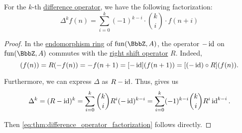 \begin{proposition}\label{thm:difference_operator_factorization}
  For the \( k \)-th \hyperref[def:difference_operator]{difference operator}, we have the following factorization:
  \begin{equation}\label{eq:thm:difference_operator_factorization}
    \Delta^k f(n) = \sum_{i=0}^k (-1)^{k-i} \cdot \binom k i \cdot f(n + i)
  \end{equation}
\end{proposition}
\begin{proof}
  In the \hyperref[def:endomorphism_semiring]{endomorphism ring} of \( \fun(\BbbZ, A) \), the operator \( -\operatorname{id} \) on \( \fun(\BbbZ, A) \) commutes with the \hyperref[def:shift_operator]{right shift operator} \( R \). Indeed,
  \begin{equation*}
    [R \bincirc (-\id)](f(n))
    =
    R(-f(n))
    =
    -f(n + 1)
    =
    [-\id](f(n + 1))
    =
    [(-\id) \bincirc R](f(n)).
  \end{equation*}

  Furthermore, we can express \( \Delta \) as \( R - \operatorname{id} \). Thus,  gives us
  \begin{equation*}
    \Delta^k
    =
    (R - \operatorname{id})^k
    =
    \sum_{i=0}^k \binom k i R^i (-\operatorname{id})^{k-i}
    =
    \sum_{i=0}^k (-1)^{k-i} \binom k i R^i \operatorname{id}^{k-i}.
  \end{equation*}

  Then \eqref{eq:thm:difference_operator_factorization} follows directly.
\end{proof}
